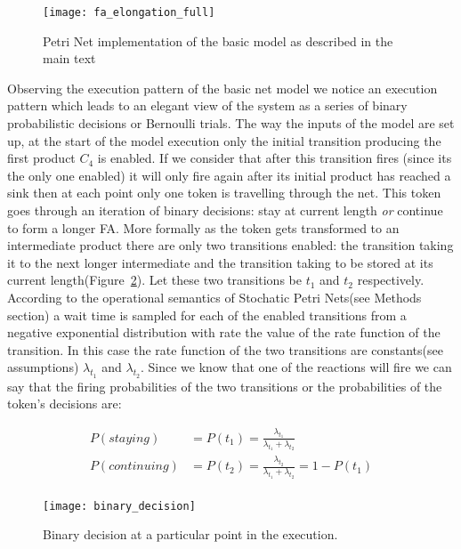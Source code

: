\begin{figure}[htbp!]
\centering
\texttt{[image: fa\_elongation\_full]}
\caption[Petri Net implementation(basic model)]{Petri Net
  implementation of the basic model as described in the main text}
\label{fig:fa_elongation_full}
\end{figure}


Observing the execution pattern of the basic net model we notice an
execution pattern which leads to an elegant view of the system as a
series of binary probabilistic decisions or Bernoulli trials. The way
the inputs of the model are set up, at the start of the model
execution only the initial transition producing the first product $C_4$ is
enabled. If we consider that after this transition fires (since its
the only one enabled) it
will only fire again after its initial product has reached a sink then
at each point only one token is travelling through the net. This token
goes through an iteration of binary decisions: stay at current length
\textit{or} continue to form a longer
FA. More formally as the token gets
transformed to an intermediate product there are only two transitions
enabled: the transition taking it to the next longer intermediate and
the transition taking to be stored at its current length(Figure~\ref{fig:binary_decision}). Let these
two transitions be $t_1$ and $t_2$ respectively. According to
the operational semantics of Stochatic Petri Nets(see Methods section)
a wait time is sampled for each of the enabled transitions from a
negative exponential distribution with rate the value of the rate
function of the
transition. In this case the rate function of the two transitions are
constants(see assumptions) $\lambda_{t_1}$ and $\lambda_{t_2}$. Since
we know that one of the reactions will fire we can say that the
firing probabilities of the two transitions or the probabilities of
the token's decisions are:

\begin{align*}
P(staying)& =P(t_1) = \frac{\lambda_{t_1}}{\lambda_{t_1} + \lambda_{t_2}}\\
P(continuing) & = P(t_2) = \frac{\lambda_{t_2}}{\lambda_{t_1} + \lambda_{t_2}} = 1 - P(t_1)\\
\end{align*}


\begin{figure}[htbp!]
\centering
\texttt{[image: binary\_decision]}
\caption[Binary stay-continue decision]{Binary decision at a
  particular point in the execution.}
\label{fig:binary_decision}
\end{figure}

